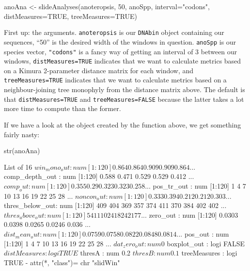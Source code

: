 \documentclass{article}
\newcommand{\fun}[1]{\texttt{#1}}
\begin{document}
\begin{console}
anoAna <- slideAnalyses(anoteropsis, 50, anoSpp, interval="codons", 
distMeasures=TRUE, treeMeasures=TRUE)
\end{console}

First up: the arguments. \fun{anoteropsis} is our \fun{DNAbin} object containing our sequences, ``50'' is the desired width of the windows in question. \fun{anoSpp} is our species vector, \fun{"codons"} is a fancy way of getting an interval of 3 between our windows, \fun{distMeasures=TRUE} indicates that we want to calculate metrics based on a Kimura 2-parameter distance matrix for each window, and \fun{treeMeasures=TRUE} indicates that we want to calculate metrics based on a neighbour-joining tree monophyly from the distance matrix above. The default is that \fun{distMeasures=TRUE} and \fun{treeMeasures=FALSE} because the latter takes a lot more time to compute than the former. 

If we have a look at the object created by the function above, we get something fairly nasty:

\begin{console}
str(anoAna)
\end{console}

\begin{Routput}
List of 16
 $ win_mono_out   : num [1:120] 0.864 0.864 0.909 0.909 0.864 ...
 $ comp_depth_out : num [1:120] 0.588 0.471 0.529 0.529 0.412 ...
 $ comp_out       : num [1:120] 0.355 0.29 0.323 0.323 0.258 ...
 $ pos_tr_out     : num [1:120] 1 4 7 10 13 16 19 22 25 28 ...
 $ noncon_out     : num [1:120] 0.333 0.394 0.212 0.212 0.303 ...
 $ thres_below_out: num [1:120] 409 404 369 357 374 411 370 384 402 402 ...
 $ thres_above_out: num [1:120] 5 4 11 10 24 18 24 21 7 7 ...
 $ zero_out       : num [1:120] 0.0303 0.0398 0.0265 0.0246 0.036 ...
 $ dist_mean_out  : num [1:120] 0.0759 0.0758 0.0822 0.0848 0.0814 ...
 $ pos_out        : num [1:120] 1 4 7 10 13 16 19 22 25 28 ...
 $ dat_zero_out   : num 0
 $ boxplot_out    : logi FALSE
 $ distMeasures   : logi TRUE
 $ thresA         : num 0.2
 $ thresB         : num 0.1
 $ treeMeasures   : logi TRUE
 - attr(*, "class")= chr "slidWin"
\end{Routput}
\end{document}
